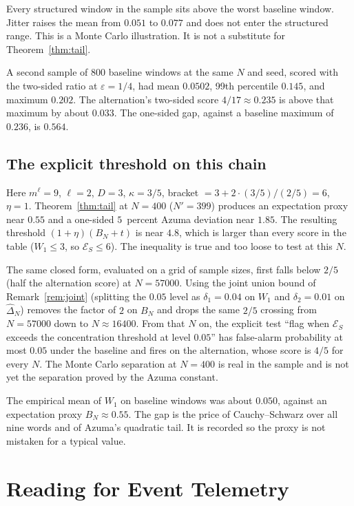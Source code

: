\documentclass[11pt,reqno]{amsart}
\theoremstyle{remark}
\newcommand{\ES}{\mathcal{E}_S}
\begin{document}
Every structured window in the sample sits above the worst baseline window. Jitter raises the mean from $0.051$ to $0.077$ and does not enter the structured range. This is a Monte Carlo illustration. It is not a substitute for Theorem~\ref{thm:tail}.

A second sample of $800$ baseline windows at the same $N$ and seed, scored with the two-sided ratio at $\varepsilon = 1/4$, had mean $0.0502$, 99th percentile $0.145$, and maximum $0.202$. The alternation's two-sided score $4/17 \approx 0.235$ is above that maximum by about $0.033$. The one-sided gap, against a baseline maximum of $0.236$, is $0.564$.

\subsection{The explicit threshold on this chain}

Here $m^\ell = 9$, $\ell = 2$, $D = 3$, $\kappa = 3/5$, bracket $= 3 + 2\cdot(3/5)/(2/5) = 6$, $\eta = 1$. Theorem~\ref{thm:tail} at $N = 400$ ($N' = 399$) produces an expectation proxy near $0.55$ and a one-sided $5$~percent Azuma deviation near $1.85$. The resulting threshold $(1+\eta)(B_N+t)$ is near $4.8$, which is larger than every score in the table ($W_1 \le 3$, so $\ES \le 6$). The inequality is true and too loose to test at this $N$.

The same closed form, evaluated on a grid of sample sizes, first falls below $2/5$ (half the alternation score) at $N = 57000$. Using the joint union bound of Remark~\ref{rem:joint} (splitting the $0.05$ level as $\delta_1 = 0.04$ on $W_1$ and $\delta_2 = 0.01$ on $\hat\Delta_N$) removes the factor of $2$ on $B_N$ and drops the same $2/5$ crossing from $N = 57000$ down to $N \approx 16400$. From that $N$ on, the explicit test ``flag when $\ES$ exceeds the concentration threshold at level $0.05$'' has false-alarm probability at most $0.05$ under the baseline and fires on the alternation, whose score is $4/5$ for every $N$. The Monte Carlo separation at $N = 400$ is real in the sample and is not yet the separation proved by the Azuma constant.

The empirical mean of $W_1$ on baseline windows was about $0.050$, against an expectation proxy $B_N \approx 0.55$. The gap is the price of Cauchy--Schwarz over all nine words and of Azuma's quadratic tail. It is recorded so the proxy is not mistaken for a typical value.

\section{Reading for Event Telemetry}\label{sec:telemetry}
\end{document}
